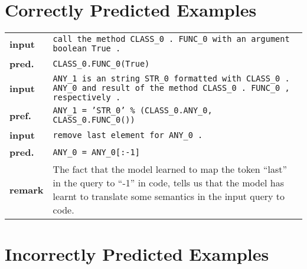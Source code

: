 \documentclass{article}
\begin{document}
  \section{Correctly Predicted Examples}

  \begin{tabular}{ l p{}}
    \hline
		\textbf{input} & \texttt{call the method CLASS\_0 . FUNC\_0 with an argument boolean True .} \\
    \textbf{pred.} & \texttt{CLASS\_0.FUNC\_0(True)} \\
    \hline
		\textbf{input} & \texttt{ANY\_1 is an string STR\_0 formatted with CLASS\_0 . ANY\_0 and 
                      result of the method CLASS\_0 . FUNC\_0 , respectively .}	\\
		\textbf{pref.} & \texttt{ANY\_1 = 'STR\_0' \% (CLASS\_0.ANY\_0, CLASS\_0.FUNC\_0())} \\
    \hline
    \textbf{input} & \texttt{remove last element for ANY\_0 .} \\
    \textbf{pred.} & \texttt{ANY\_0 = ANY\_0[:-1]} \\
    \textbf{remark}& The fact that the model learned to map the token ``last'' in the query to 
                     ``-1'' in code, tells us that the model has learnt to translate some 
                     semantics in the input query to code. \\
    \hline
  \end{tabular}

  \section{Incorrectly Predicted Examples}
\end{document}
